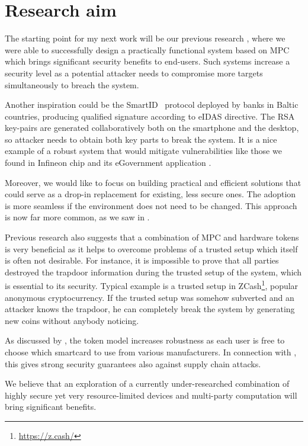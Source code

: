 \documentclass[
  digital, %
  twoside, %
  table,   %
  lof,     %
  lot,     %
]{fithesis3}
\newcounter{ph4_show_guides}
\theoremstyle{definition}
\theoremstyle{remark}
\begin{document}
\section{Research aim}
The starting point for my next work will be our previous research \cite{2017-ccs-mavroudis}, where we were able to successfully design a practically functional system based on MPC which brings significant security benefits to end-users. Such systems increase a security level as a potential attacker needs to compromise more targets simultaneously to breach the system. 

Another inspiration could be the SmartID~\cite{smart_id_ee} protocol deployed by banks in Baltic countries, producing qualified signature according to eIDAS directive. The RSA key-pairs are generated collaboratively both on the smartphone and the desktop, so attacker needs to obtain both key parts to break the system. It is a nice example of a robust system that would mitigate vulnerabilities like those we found in Infineon chip and its eGovernment application \cite{2017-ccs-nemec}. 

Moreover, we would like to focus on building practical and efficient solutions that could serve as a drop-in replacement for existing, less secure ones. 
The adoption is more seamless if the environment does not need to be changed.
This approach is now far more common, as we saw in \cite{smart_id_ee, DCMBR18}. %

Previous research also suggests that a combination of MPC and hardware tokens is very beneficial as it helps to overcome problems of a trusted setup which  itself is often not desirable. For instance, it is impossible to prove that all parties destroyed the trapdoor information during the trusted setup of the system, which is essential to its security. Typical example is a trusted setup in ZCash\footnote{\url{https://z.cash/}}, popular anonymous cryptocurrency. If the trusted setup was somehow subverted and an attacker knows the trapdoor, he can completely break the system by generating new coins without anybody noticing.

As discussed by \cite{K07}, the token model increases robustness as each user is free to choose which smartcard to use from various manufacturers. In connection with \cite{2017-ccs-nemec}, this gives strong security guarantees also against supply chain attacks.

We believe that an exploration of a currently under-researched combination of highly secure yet very resource-limited devices and multi-party computation will bring significant benefits.
\end{document}
